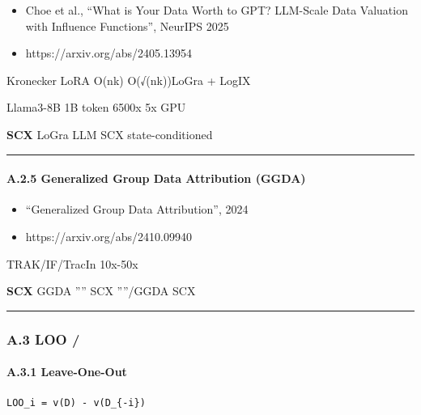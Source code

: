 \documentclass[
  12pt,
]{article}
\providecommand{\tightlist}{%
  \setlength{\itemsep}{0pt}\setlength{\parskip}{0pt}}
\begin{document}
\begin{itemize}
\tightlist
\item
  \textbf{}Choe et al., ``What is Your Data Worth to GPT?
  LLM-Scale Data Valuation with Influence Functions'', NeurIPS 2025
\item
  \textbf{}https://arxiv.org/abs/2405.13954
\end{itemize}

\textbf{} Kronecker 
LoRA O(nk)  O(√(nk))LoGra  + LogIX


\textbf{} Llama3-8B  1B token  6500x
5x GPU 

\textbf{SCX }LoGra  LLM
SCX
 state-conditioned 

\begin{center}\rule{0.5\linewidth}{0.5pt}\end{center}

\paragraph{A.2.5 Generalized Group Data Attribution
(GGDA)}\label{a.2.5-generalized-group-data-attribution-ggda}

\begin{itemize}
\tightlist
\item
  \textbf{}``Generalized Group Data Attribution'', 2024
\item
  \textbf{}https://arxiv.org/abs/2410.09940
\end{itemize}

\textbf{} TRAK/IF/TracIn
\textbf{}10x-50x


\textbf{SCX }GGDA
'''' SCX
''''/\textbf{}GGDA
SCX 

\begin{center}\rule{0.5\linewidth}{0.5pt}\end{center}

\subsubsection{A.3 LOO / }\label{a.3-loo-ux7559ux51faux6cd5}

\paragraph{A.3.1 
Leave-One-Out}\label{a.3.1-ux7ecfux5178-leave-one-out}

\textbf{}

\begin{verbatim}
LOO_i = v(D) - v(D_{-i})
\end{verbatim}
\end{document}
